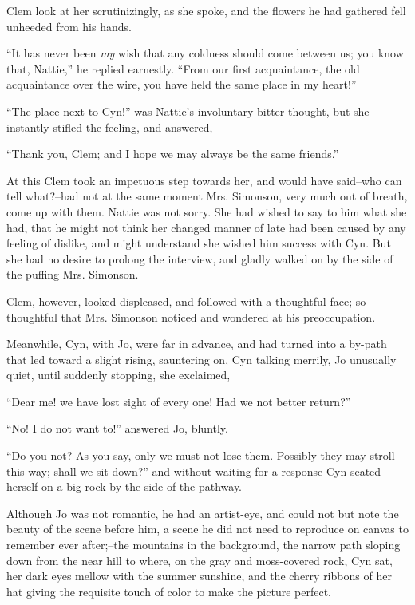 Clem look at her scrutinizingly, as she spoke, and the flowers he had
gathered fell unheeded from his hands.

``It has never been \emph{my} wish that any coldness should come between us; you
know that, Nattie,'' he replied earnestly. ``From our first acquaintance,
the old acquaintance over the wire, you have held the same place in my
heart!''

``The place next to Cyn!'' was Nattie's involuntary bitter thought, but
she instantly stifled the feeling, and answered,

``Thank you, Clem; and I hope we may always be the same friends.''

At this Clem took an impetuous step towards her, and would have
said--who can tell what?--had not at the same moment Mrs. Simonson, very
much out of breath, come up with them. Nattie was not sorry. She had
wished to say to him what she had, that he might not think her changed
manner of late had been caused by any feeling of dislike, and might
understand she wished him success with Cyn. But she had no desire to
prolong the interview, and gladly walked on by the side of the puffing
Mrs. Simonson.

Clem, however, looked displeased, and followed with a thoughtful face;
so thoughtful that Mrs. Simonson noticed and wondered at his
preoccupation.

Meanwhile, Cyn, with Jo, were far in advance, and had turned into a
by-path that led toward a slight rising, sauntering on, Cyn talking
merrily, Jo unusually quiet, until suddenly stopping, she exclaimed,

``Dear me! we have lost sight of every one! Had we not better return?''

``No! I do not want to!'' answered Jo, bluntly.

``Do you not? As you say, only we must not lose them. Possibly they may
stroll this way; shall we sit down?'' and without waiting for a response
Cyn seated herself on a big rock by the side of the pathway.

Although Jo was not romantic, he had an artist-eye, and could not but
note the beauty of the scene before him, a scene he did not need to
reproduce on canvas to remember ever after;--the mountains in the
background, the narrow path sloping down from the near hill to where, on
the gray and moss-covered rock, Cyn sat, her dark eyes mellow with the
summer sunshine, and the cherry ribbons of her hat giving the requisite
touch of color to make the picture perfect.

